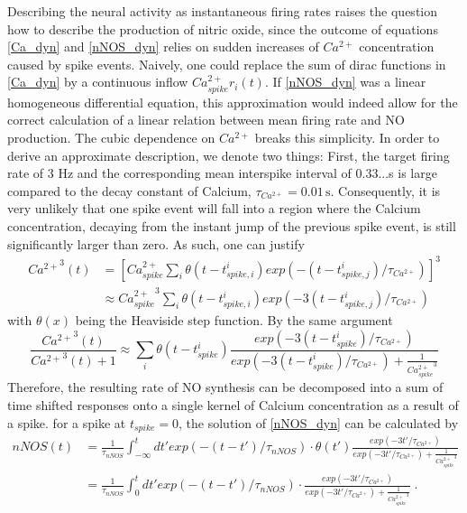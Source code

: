 \documentclass[10pt,a4paper]{article}
\begin{document}
Describing the neural activity as instantaneous firing rates raises the question how to describe the production of nitric oxide, since the outcome of equations \eqref{Ca_dyn} and \eqref{nNOS_dyn} relies on sudden increases of $Ca^{2+}$ concentration caused by spike events. Naively, one could replace the sum of dirac functions in \eqref{Ca_dyn} by a continuous inflow $Ca^{2+}_{spike} r_i(t)$. If \eqref{nNOS_dyn} was a linear homogeneous differential equation, this approximation would indeed allow for the correct calculation of a linear relation between mean firing rate and NO production. The cubic dependence on $Ca^{2+}$ breaks this simplicity. In order to derive an approximate description, we denote two things: First, the target firing rate of 3 Hz and the corresponding mean interspike interval of 0.33...s is large compared to the decay constant of Calcium, $\tau_{Ca^{2+}} = \mathrm{0.01\,s}$. Consequently, it is very unlikely that one spike event will fall into a region where the Calcium concentration, decaying from the instant jump of the previous spike event, is still significantly larger than zero. As such, one can justify
\begin{equation}
\begin{split}
{Ca^{2+}}^3(t) &= \left[ Ca^{2+}_{spike} \sum_{i} \theta(t-t^i_{spike,i}) exp(-(t-t^i_{spike,j})/\tau_{Ca^{2+}}) \right]^3 \\
&\approx {Ca^{2+}_{spike}}^3 \sum_{i} \theta(t-t^i_{spike,i}) exp(-3(t-t^i_{spike,j})/\tau_{Ca^{2+}})
\end{split} \label{cubic_approx_1}			
\end{equation}
with $\theta(x)$ being the Heaviside step function. By the same argument
\begin{equation}
\frac{{Ca^{2+}}^3(t)}{{Ca^{2+}}^3(t)+1} \approx \sum_{i} \theta(t-t^i_{spike}) \frac{exp(-3(t-t^i_{spike})/\tau_{Ca^{2+}})}{exp(-3(t-t^i_{spike})/\tau_{Ca^{2+}}) + \frac{1}{{Ca^{2+}_{spike}}^3}}  
\end{equation}
Therefore, the resulting rate of NO synthesis can be decomposed into a sum of time shifted responses onto a single kernel of Calcium concentration as a result of a spike. for a spike at $t_{spike}=0$, the solution of \eqref{nNOS_dyn} can be calculated by
\begin{equation}
\begin{split}
nNOS(t) &= \frac{1}{\tau_{nNOS}}\int_{-\infty}^t dt' exp(-(t-t')/\tau_{nNOS})\cdot \theta(t') \frac{exp(-3t'/\tau_{Ca^{2+}})}{exp(-3t'/\tau_{Ca^{2+}}) + \frac{1}{{Ca^{2+}_{spike}}^3}} \\
&= \frac{1}{\tau_{nNOS}}\int_{0}^t dt' exp(-(t-t')/\tau_{nNOS})\cdot \frac{exp(-3t'/\tau_{Ca^{2+}})}{exp(-3t'/\tau_{Ca^{2+}}) + \frac{1}{{Ca^{2+}_{spike}}^3}}\;.
\end{split}\label{nNOS_single_sol}
\end{equation}
\end{document}

